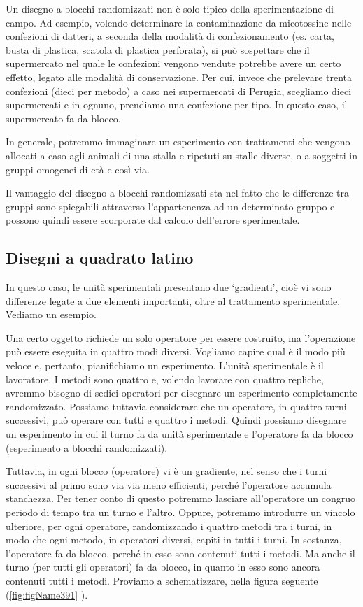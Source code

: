 \documentclass[a4paper,12pt,oneside]{book}
\begin{document}
Un disegno a blocchi randomizzati non è solo tipico della sperimentazione di campo. Ad esempio, volendo determinare la contaminazione da micotossine nelle confezioni di datteri, a seconda della modalità di confezionamento (es. carta, busta di plastica, scatola di plastica perforata), si può sospettare che il supermercato nel quale le confezioni vengono vendute potrebbe avere un certo effetto, legato alle modalità di conservazione. Per cui, invece che prelevare trenta confezioni (dieci per metodo) a caso nei supermercati di Perugia, scegliamo dieci supermercati e in ognuno, prendiamo una confezione per tipo. In questo caso, il supermercato fa da blocco.

In generale, potremmo immaginare un esperimento con trattamenti che vengono allocati a caso agli animali di una stalla e ripetuti su stalle diverse, o a soggetti in gruppi omogenei di età e così via.

Il vantaggio del disegno a blocchi randomizzati sta nel fatto che le differenze tra gruppi sono spiegabili attraverso l'appartenenza ad un determinato gruppo e possono quindi essere scorporate dal calcolo dell'errore sperimentale.

\hypertarget{disegni-a-quadrato-latino}{%
\subsection{Disegni a quadrato latino}\label{disegni-a-quadrato-latino}}

In questo caso, le unità sperimentali presentano due `gradienti', cioè vi sono differenze legate a due elementi importanti, oltre al trattamento sperimentale. Vediamo un esempio.

Una certo oggetto richiede un solo operatore per essere costruito, ma l'operazione può essere eseguita in quattro modi diversi. Vogliamo capire qual è il modo più veloce e, pertanto, pianifichiamo un esperimento. L'unità sperimentale è il lavoratore. I metodi sono quattro e, volendo lavorare con quattro repliche, avremmo bisogno di sedici operatori per disegnare un esperimento completamente randomizzato. Possiamo tuttavia considerare che un operatore, in quattro turni successivi, può operare con tutti e quattro i metodi. Quindi possiamo disegnare un esperimento in cui il turno fa da unità sperimentale e l'operatore fa da blocco (esperimento a blocchi randomizzati).

Tuttavia, in ogni blocco (operatore) vi è un gradiente, nel senso che i turni successivi al primo sono via via meno efficienti, perché l'operatore accumula stanchezza. Per tener conto di questo potremmo lasciare all'operatore un congruo periodo di tempo tra un turno e l'altro. Oppure, potremmo introdurre un vincolo ulteriore, per ogni operatore, randomizzando i quattro metodi tra i turni, in modo che ogni metodo, in operatori diversi, capiti in tutti i turni. In sostanza, l'operatore fa da blocco, perché in esso sono contenuti tutti i metodi. Ma anche il turno (per tutti gli operatori) fa da blocco, in quanto in esso sono ancora contenuti tutti i metodi. Proviamo a schematizzare, nella figura seguente (\ref{fig:figName391} ).
\end{document}
